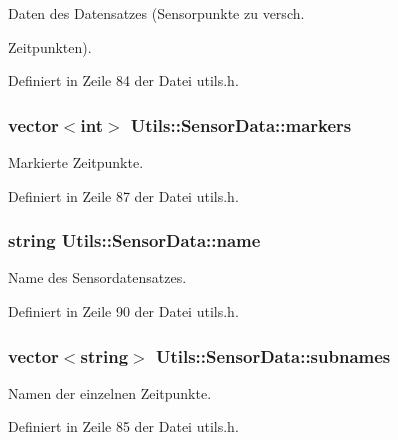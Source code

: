 Daten des Datensatzes (Sensorpunkte zu versch. 

Zeitpunkten). 

Definiert in Zeile 84 der Datei utils.\-h.

\hypertarget{structUtils_1_1SensorData_ac2d7e037f39affd6ad9d4aa29ed579da}{
\subsubsection[{markers}]{\setlength{\rightskip}{0pt plus 5cm}vector$<$int$>$ Utils\-::\-Sensor\-Data\-::markers}}\label{structUtils_1_1SensorData_ac2d7e037f39affd6ad9d4aa29ed579da}


Markierte Zeitpunkte. 



Definiert in Zeile 87 der Datei utils.\-h.

\hypertarget{structUtils_1_1SensorData_a52474d0fe0dce0d3ee73c007a150a507}{
\subsubsection[{name}]{\setlength{\rightskip}{0pt plus 5cm}string Utils\-::\-Sensor\-Data\-::name}}\label{structUtils_1_1SensorData_a52474d0fe0dce0d3ee73c007a150a507}


Name des Sensordatensatzes. 



Definiert in Zeile 90 der Datei utils.\-h.

\hypertarget{structUtils_1_1SensorData_ad5875ab7e8ebdc9dc41a7b9ef1c063ba}{
\subsubsection[{subnames}]{\setlength{\rightskip}{0pt plus 5cm}vector$<$string$>$ Utils\-::\-Sensor\-Data\-::subnames}}\label{structUtils_1_1SensorData_ad5875ab7e8ebdc9dc41a7b9ef1c063ba}


Namen der einzelnen Zeitpunkte. 



Definiert in Zeile 85 der Datei utils.\-h.

